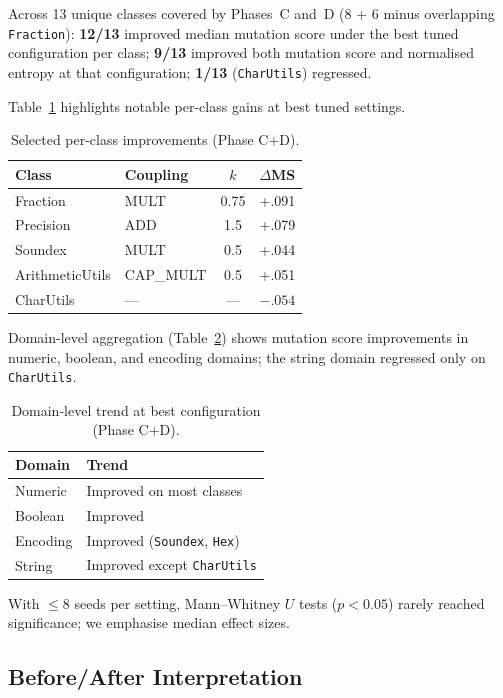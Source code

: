 \documentclass{IEEEtran}
\begin{document}
Across 13 unique classes covered by Phases~C and~D (8 + 6 minus overlapping \texttt{Fraction}):
\textbf{12/13} improved median mutation score under the best tuned configuration per class;
\textbf{9/13} improved both mutation score and normalised entropy at that configuration;
\textbf{1/13} (\texttt{CharUtils}) regressed.

Table~\ref{tab:gains} highlights notable per-class gains at best tuned settings.

\begin{table}[htbp]
\caption{Selected per-class improvements (Phase C+D).}
\label{tab:gains}
\centering
\small
\setlength{\tabcolsep}{3pt}
\begin{tabular}{@{}llcr@{}}
\toprule
Class & Coupling & $k$ & $\Delta$MS \\
\midrule
Fraction & MULT & 0.75 & +.091 \\
Precision & ADD & 1.5 & +.079 \\
Soundex & MULT & 0.5 & +.044 \\
ArithmeticUtils & CAP\_MULT & 0.5 & +.051 \\
CharUtils & --- & --- & $-.054$ \\
\bottomrule
\end{tabular}
\end{table}

Domain-level aggregation (Table~\ref{tab:domain}) shows mutation score improvements in numeric, boolean, and encoding domains; the string domain regressed only on \texttt{CharUtils}.

\begin{table}[htbp]
\caption{Domain-level trend at best configuration (Phase C+D).}
\label{tab:domain}
\centering
\small
\begin{tabular}{@{}ll@{}}
\toprule
Domain & Trend \\
\midrule
Numeric & Improved on most classes \\
Boolean & Improved \\
Encoding & Improved (\texttt{Soundex}, \texttt{Hex}) \\
String & Improved except \texttt{CharUtils} \\
\bottomrule
\end{tabular}
\end{table}

With $\leq 8$ seeds per setting, Mann--Whitney $U$ tests ($p < 0.05$) rarely reached significance; we emphasise median effect sizes.

\subsection{Before/After Interpretation}
\end{document}
